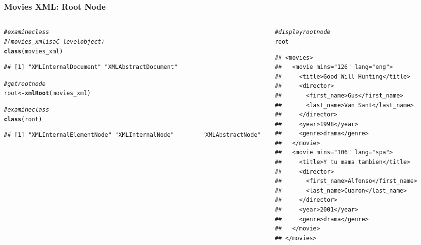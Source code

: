 \documentclass[12pt]{beamer}\usepackage[]{graphicx}\usepackage[]{color}
\makeatletter
\newcommand{\hlcom}[1]{\textcolor[rgb]{0.678,0.584,0.686}{\textit{#1}}}%
\newcommand{\hlstd}[1]{\textcolor[rgb]{0.345,0.345,0.345}{#1}}%
\newcommand{\hlkwb}[1]{\textcolor[rgb]{0.69,0.353,0.396}{#1}}%
\newcommand{\hlkwd}[1]{\textcolor[rgb]{0.737,0.353,0.396}{\textbf{#1}}}%
\newenvironment{kframe}{%
 \def\at@end@of@kframe{}%
 \ifinner\ifhmode%
  \def\at@end@of@kframe{\end{minipage}}%
  \begin{minipage}{\columnwidth}%
 \fi\fi%
 \def\FrameCommand##1{\hskip\@totalleftmargin \hskip-\fboxsep
 \colorbox{shadecolor}{##1}\hskip-\fboxsep
     \hskip-\linewidth \hskip-\@totalleftmargin \hskip\columnwidth}%
 \MakeFramed {\advance\hsize-\width
   \@totalleftmargin\z@ \linewidth\hsize
   \@setminipage}}%
 {\par\unskip\endMakeFramed%
 \at@end@of@kframe}
\newenvironment{knitrout}{}{} %
\makeatother
\begin{document}

\begin{frame}[fragile]
\frametitle{Movies XML: Root Node}

\begin{columns}[t]
\begin{column}{0.5\textwidth}
\begin{knitrout}\tiny
{}\color{fgcolor}\begin{kframe}
\begin{alltt}
\hlcom{# examine class}
\hlcom{# (movies_xml is a C-level object)}
\hlkwd{class}\hlstd{(movies_xml)}
\end{alltt}
\begin{verbatim}
## [1] "XMLInternalDocument" "XMLAbstractDocument"
\end{verbatim}
\begin{alltt}
\hlcom{# get root node}
\hlstd{root} \hlkwb{<-} \hlkwd{xmlRoot}\hlstd{(movies_xml)}

\hlcom{# examine class}
\hlkwd{class}\hlstd{(root)}
\end{alltt}
\begin{verbatim}
## [1] "XMLInternalElementNode" "XMLInternalNode"        "XMLAbstractNode"
\end{verbatim}
\end{kframe}
\end{knitrout}
\end{column}

\begin{column}{0.5\textwidth}
\begin{knitrout}\tiny
{}\color{fgcolor}\begin{kframe}
\begin{alltt}
\hlcom{# display root node}
\hlstd{root}
\end{alltt}
\begin{verbatim}
## <movies>
##   <movie mins="126" lang="eng">
##     <title>Good Will Hunting</title>
##     <director>
##       <first_name>Gus</first_name>
##       <last_name>Van Sant</last_name>
##     </director>
##     <year>1998</year>
##     <genre>drama</genre>
##   </movie>
##   <movie mins="106" lang="spa">
##     <title>Y tu mama tambien</title>
##     <director>
##       <first_name>Alfonso</first_name>
##       <last_name>Cuaron</last_name>
##     </director>
##     <year>2001</year>
##     <genre>drama</genre>
##   </movie>
## </movies>
\end{verbatim}
\end{kframe}
\end{knitrout}
\end{column}
\end{columns}

\end{frame}
\end{document}
